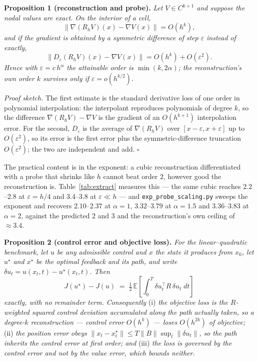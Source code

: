 \documentclass[conference]{IEEEtran}
\begin{document}
\smallskip
\noindent\textbf{Proposition 1 (reconstruction and probe).} \emph{Let $V \in C^{k+1}$ and suppose the
nodal values are exact. On the interior of a cell,}
\begin{equation}
\big\| \nabla (R_h V)(x) - \nabla V(x) \big\| = O(h^{k}),
\end{equation}
\emph{and if the gradient is obtained by a symmetric difference of step $\varepsilon$ instead of
exactly,}
\begin{equation}
\big\| D_{\varepsilon}(R_h V)(x) - \nabla V(x) \big\| = O(h^{k}) + O(\varepsilon^{2}).
\end{equation}
\emph{Hence with $\varepsilon = c\,h^{\alpha}$ the attainable order is $\min(k, 2\alpha)$; the
reconstruction's own order $k$ survives only if $\varepsilon = o(h^{k/2})$.}

\emph{Proof sketch.} The first estimate is the standard derivative loss of one order in polynomial
interpolation: the interpolant reproduces polynomials of degree $k$, so the difference
$\nabla(R_hV) - \nabla V$ is the gradient of an $O(h^{k+1})$ interpolation error. For the second,
$D_\varepsilon$ is the average of $\nabla(R_hV)$ over $[x-\varepsilon, x+\varepsilon]$ up to
$O(\varepsilon^2)$, so its error is the first error plus the symmetric-difference truncation
$O(\varepsilon^2)$; the two are independent and add. $\square$

The practical content is in the exponent: a cubic reconstruction differentiated with a probe that
shrinks like $h$ cannot beat order $2$, however good the reconstruction is. Table~\ref{tab:extract}
measures this --- the same cubic reaches $2.2$--$2.8$ at $\varepsilon = h/4$ and $3.4$--$3.8$ at
$\varepsilon \ll h$ --- and \texttt{exp\_probe\_scaling.py} sweeps the exponent and recovers
$2.10$--$2.37$ at $\alpha = 1$, $3.32$--$3.79$ at $\alpha = 1.5$ and $3.36$--$3.83$ at
$\alpha = 2$, against the predicted $2$ and $3$ and the reconstruction's own ceiling of $\approx
3.4$.

\smallskip
\noindent\textbf{Proposition 2 (control error and objective loss).} \emph{For the
linear--quadratic benchmark, let $u$ be any admissible control and $x$ the state it produces from
$x_0$, let $u^\star$ and $x^\star$ be the optimal feedback and its path, and write
$\delta u_t = u(x_t,t) - u^\star(x_t,t)$. Then}
\begin{equation}\label{eq:loss}
J(u^\star) - J(u) \;=\; \tfrac{1}{2}\,\mathbb{E}\!\left[\int_0^T\!
\delta u_t^\top R \,\delta u_t \; dt\right]
\end{equation}
\emph{exactly, with no remainder term. Consequently} (i) \emph{the objective loss is the
$R$-weighted squared control deviation accumulated along the path actually taken, so a degree-$k$
reconstruction --- control error $O(h^{k})$ --- loses $O(h^{2k})$ of objective;} (ii) \emph{the
position error obeys $\|x_t - x^\star_t\| \le T\|B\|\sup_t\|\delta u_t\|$, so the path inherits the
control error at first order; and} (iii) \emph{the loss is governed by the control error and not by
the value error, which bounds neither.}
\end{document}
